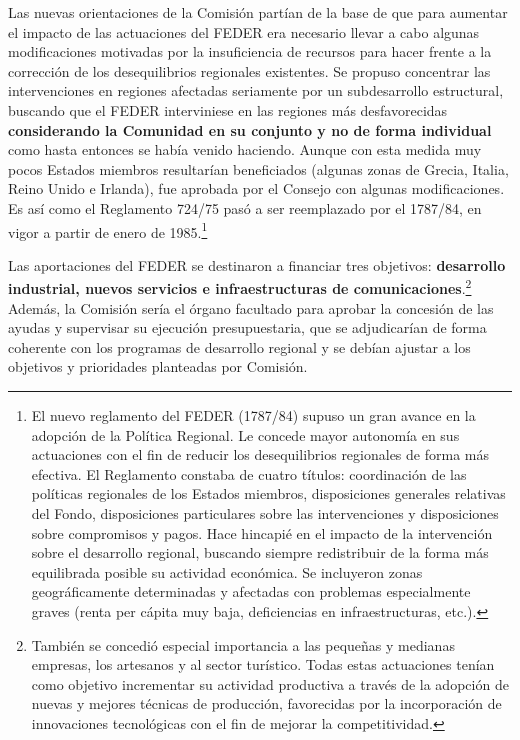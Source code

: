 \documentclass[10pt,a4paper]{article}
\begin{document}
Las nuevas orientaciones de la Comisión partían de la base de que para aumentar el impacto de las actuaciones del FEDER era necesario llevar a cabo algunas modificaciones motivadas por la insuficiencia de recursos para hacer frente a la corrección de los desequilibrios regionales existentes. Se propuso concentrar las intervenciones en regiones afectadas seriamente por un subdesarrollo estructural, buscando que el FEDER interviniese en las regiones más desfavorecidas \textbf{considerando la Comunidad en su conjunto y no de forma individual} como hasta entonces se había venido haciendo. Aunque con esta medida muy pocos Estados miembros resultarían beneficiados (algunas zonas de Grecia, Italia, Reino Unido e Irlanda), fue aprobada por el Consejo con algunas modificaciones. Es así como el Reglamento 724/75 pasó a ser reemplazado por el 1787/84, en vigor a partir de enero de 1985.\footnote{%
    El nuevo reglamento del FEDER (1787/84) supuso un gran avance en la adopción de la Política Regional. Le concede mayor autonomía en sus actuaciones con el fin de reducir los desequilibrios regionales de forma más efectiva. El Reglamento constaba de cuatro títulos: coordinación de las políticas regionales de los Estados miembros, disposiciones generales relativas del Fondo, disposiciones particulares sobre las intervenciones y disposiciones sobre compromisos y pagos. Hace hincapié en el impacto de la intervención sobre el desarrollo regional, buscando siempre redistribuir de la forma más equilibrada posible su actividad económica. Se incluyeron zonas geográficamente determinadas y afectadas con problemas especialmente graves (renta per cápita muy baja, deficiencias en infraestructuras, etc.).
}

Las aportaciones del FEDER se destinaron a financiar tres objetivos: \textbf{desarrollo industrial, nuevos servicios e infraestructuras de comunicaciones}.\footnote{%
    También se concedió especial importancia a las pequeñas y medianas empresas, los artesanos y al sector turístico. Todas estas actuaciones tenían como objetivo incrementar su actividad productiva a través de la adopción de nuevas y mejores técnicas de producción, favorecidas por la incorporación de innovaciones tecnológicas con el fin de mejorar la competitividad.
} Además, la Comisión sería el órgano facultado para aprobar la concesión de las ayudas y supervisar su ejecución presupuestaria, que se adjudicarían de forma coherente con los programas de desarrollo regional y se debían ajustar a los objetivos y prioridades planteadas por Comisión.
\end{document}
